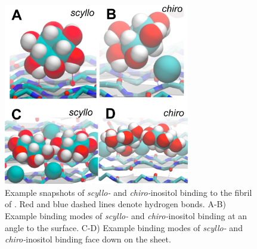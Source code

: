 \begin{figure}[htbp]
  \centering
  \includegraphics[width=3.2in]{figures/results1/GA4_paper_figures_submitted-7}
  \caption[Binding of \textit{scyllo-} and \textit{chiro-}inositol to the fibrillar aggregate of \gafour.]{Example snapshots of \textit{scyllo-} and \textit{chiro-}inositol binding to the fibril of \gafour. Red and blue dashed lines denote hydrogen bonds. A-B) Example binding modes of \textit{scyllo-} and \textit{chiro-}inositol binding at an angle to the surface. C-D) Example binding modes of \textit{scyllo-} and \textit{chiro-}inositol binding face down on the sheet.}
   \label{fig:figure7}
\end{figure}

